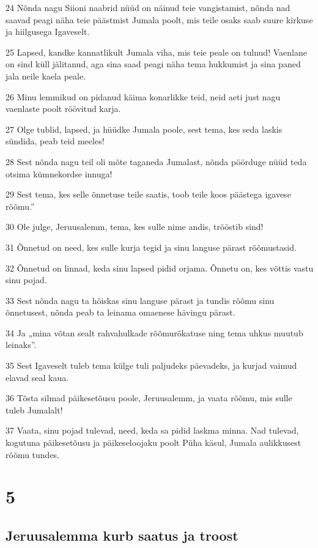 \par 24 Nõnda nagu Siioni naabrid nüüd on näinud teie vangistamist, nõnda nad saavad peagi näha teie päästmist Jumala poolt, mis teile osaks saab suure kirkuse ja hiilgusega Igaveselt.
\par 25 Lapsed, kandke kannatlikult Jumala viha, mis teie peale on tulnud! Vaenlane on sind küll jälitanud, aga sina saad peagi näha tema hukkumist ja sina paned jala neile kaela peale.
\par 26 Minu lemmikud on pidanud käima konarlikke teid, neid aeti just nagu vaenlaste poolt röövitud karja.
\par 27 Olge tublid, lapsed, ja hüüdke Jumala poole, sest tema, kes seda laskis sündida, peab teid meeles!
\par 28 Sest nõnda nagu teil oli mõte taganeda Jumalast, nõnda pöörduge nüüd teda otsima kümnekordse innuga!
\par 29 Sest tema, kes selle õnnetuse teile saatis, toob teile koos päästega igavese rõõmu.”
\par 30 Ole julge, Jeruusalemm, tema, kes sulle nime andis, trööstib sind!
\par 31 Õnnetud on need, kes sulle kurja tegid ja sinu languse pärast rõõmustasid.
\par 32 Õnnetud on linnad, keda sinu lapsed pidid orjama. Õnnetu on, kes võttis vastu sinu pojad.
\par 33 Sest nõnda nagu ta hõiskas sinu languse pärast ja tundis rõõmu sinu õnnetusest, nõnda peab ta leinama omaenese hävingu pärast.
\par 34 Ja „mina võtan sealt rahvahulkade rõõmurõkatuse ning tema uhkus muutub leinaks”.
\par 35 Sest Igaveselt tuleb tema külge tuli paljudeks päevadeks, ja kurjad vaimud elavad seal kaua.
\par 36 Tõsta silmad päikesetõusu poole, Jeruusalemm, ja vaata rõõmu, mis sulle tuleb Jumalalt!
\par 37 Vaata, sinu pojad tulevad, need, keda sa pidid laskma minna. Nad tulevad, kogutuna päikesetõusu ja päikeseloojaku poolt Püha käsul, Jumala aulikkusest rõõmu tundes.

\chapter{5}

\section*{Jeruusalemma kurb saatus ja troost}

